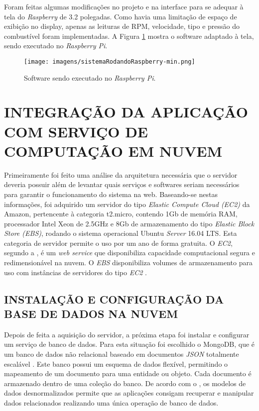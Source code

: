Foram feitas algumas modificações no projeto e na interface para se adequar à tela do \textit{Raspberry} de 3.2 polegadas. Como havia uma limitação de espaço de exibição no display, apenas as leituras de RPM, velocidade, tipo e pressão do combustível foram implementadas. A Figura \ref{Fig:raspberry_sistema} mostra o software adaptado à tela, sendo executado no \textit{Raspberry Pi}.

\begin{figure}[!ht]
\centering
\caption{Software sendo executado no \textit{Raspberry Pi}.} 
{\texttt{[image: imagens/sistemaRodandoRaspberry-min.png]}}\\
 \label{Fig:raspberry_sistema}
\end{figure}

\section{INTEGRAÇÃO DA APLICAÇÃO COM SERVIÇO DE COMPUTAÇÃO EM NUVEM}
Primeiramente foi feito uma análise da arquitetura necessária que o servidor deveria possuir além de levantar quais serviços e softwares seriam necessários para garantir o funcionamento do sistema na web. Baseando-se nestas informações, foi adquirido um servidor do tipo \textit{Elastic Compute Cloud (EC2)} da Amazon, pertencente à categoria t2.micro, contendo 1Gb de memória RAM, processador Intel Xeon de 2.5GHz e 8Gb de armazenamento do tipo \textit{Elastic Block Store (EBS)}, rodando o sistema operacional Ubuntu \textit{Server} 16.04 LTS. Esta categoria de servidor permite o uso por um ano de forma gratuita. O \textit{EC2}, segundo a , é um \textit{web service} que disponibiliza capacidade computacional segura e redimensionável na nuvem. O \textit{EBS} disponibiliza volumes de armazenamento para uso com instâncias de servidores do tipo \textit{EC2} \nocite{amazonebs}.

\subsection{INSTALAÇÃO E CONFIGURAÇÃO DA BASE DE DADOS NA NUVEM}
Depois de feita a aquisição do servidor, a próxima etapa foi instalar e configurar um serviço de banco de dados. Para esta situação foi escolhido o MongoDB, que é um banco de dados não relacional baseado em documentos \textit{JSON} totalmente escalável \cite{mongodbwhatis}. Este banco possui um esquema de dados flexível, permitindo o mapeamento de um documento para uma entidade ou objeto. Cada documento é armazenado dentro de uma coleção do banco. De acordo com o , os modelos de dados desnormalizados permite que as aplicações consigam recuperar e manipular dados relacionados realizando uma única operação de banco de dados.

